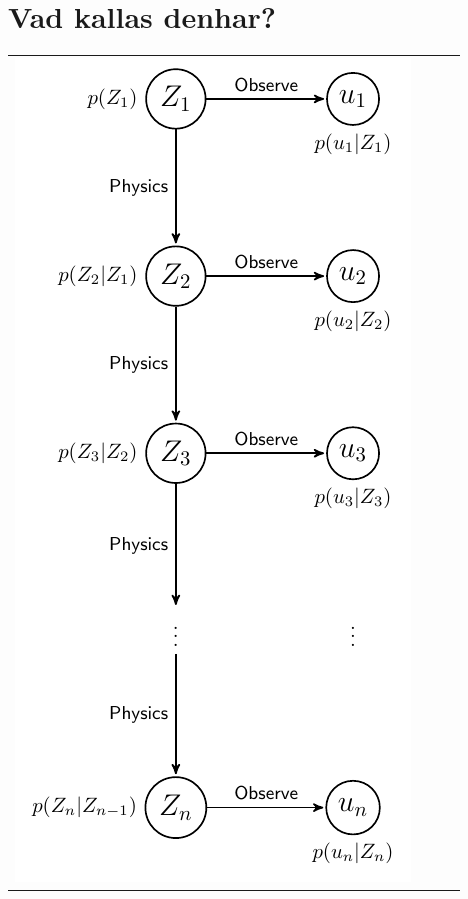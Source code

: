 \section*{Vad kallas denhar?}


\begin{minipage}{\linewidth}
\begin{tabular}{llll}
        \includegraphics[width=0.2\linewidth]{figures/hmm-graph/hmm-graph.pdf}
\end{tabular}
\end{minipage}

